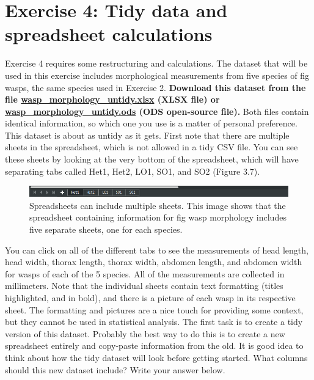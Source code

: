 \documentclass[
]{scrbook}
\begin{document}
\hypertarget{exercise-4-tidy-data-and-spreadsheet-calculations}{%
\section{Exercise 4: Tidy data and spreadsheet calculations}\label{exercise-4-tidy-data-and-spreadsheet-calculations}}

Exercise 4 requires some restructuring and calculations.
The dataset that will be used in this exercise includes morphological measurements from five species of fig wasps, the same species used in Exercise 2.
\textbf{Download this dataset from the file \href{https://raw.githubusercontent.com/bradduthie/statistical_techniques/main/data/wasp_morphology_untidy.xlsx}{wasp\_morphology\_untidy.xlsx} (XLSX file) or \href{https://raw.githubusercontent.com/bradduthie/statistical_techniques/main/data/wasp_morphology_untidy.ods}{wasp\_morphology\_untidy.ods} (ODS open-source file).}
Both files contain identical information, so which one you use is a matter of personal preference.
This dataset is about as untidy as it gets.
First note that there are multiple sheets in the spreadsheet, which is not allowed in a tidy CSV file.
You can see these sheets by looking at the very bottom of the spreadsheet, which will have separating tabs called Het1, Het2, LO1, SO1, and SO2 (Figure 3.7).

\begin{figure}
\includegraphics[width=1\linewidth]{img/spreadsheet_tabs} \caption{Spreadsheets can include multiple sheets. This image shows that the spreadsheet containing information for fig wasp morphology includes five separate sheets, one for each species.}\label{fig:unnamed-chunk-18}
\end{figure}

You can click on all of the different tabs to see the measurements of head length, head width, thorax length, thorax width, abdomen length, and abdomen width for wasps of each of the 5 species.
All of the measurements are collected in millimeters.
Note that the individual sheets contain text formatting (titles highlighted, and in bold), and there is a picture of each wasp in its respective sheet.
The formatting and pictures are a nice touch for providing some context, but they cannot be used in statistical analysis.
The first task is to create a tidy version of this dataset.
Probably the best way to do this is to create a new spreadsheet entirely and copy-paste information from the old.
It is good idea to think about how the tidy dataset will look before getting started.
What columns should this new dataset include? Write your answer below.
\end{document}
